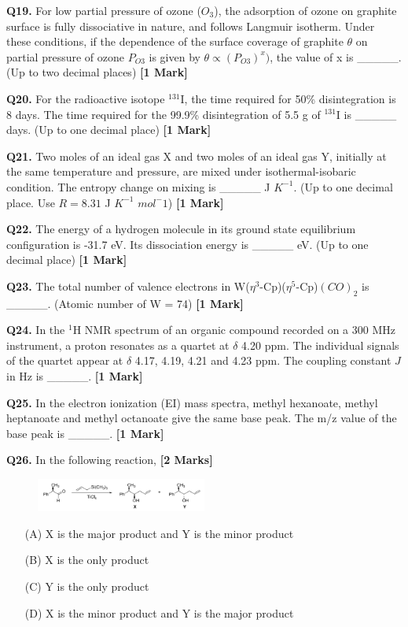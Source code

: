 \documentclass[11pt]{article}
\newcommand{\questiona}[2]{
    \noindent\textbf{Q#2.} #1 \hfill \textbf{[1 Mark]}
}
\newcommand{\questionb}[2]{
    \noindent\textbf{Q#2.} #1 \hfill \textbf{[2 Marks]}
}
\begin{document}
\questiona{For low partial pressure of ozone ($O_3$), the adsorption of ozone on graphite surface is fully dissociative in nature, and follows Langmuir isotherm. Under these conditions, if the dependence of the surface coverage of graphite \(\theta\) on partial pressure of ozone $P_{O3}$ is given by $\theta \propto (P_{O3})^x)$, the value of x is \_\_\_\_\_. (Up to two decimal places)}{19}
\vspace{0.5cm}

\questiona{For the radioactive isotope \(^{131}\)I, the time required for 50\% disintegration is 8 days. The time required for the 99.9\% disintegration of 5.5 g of \(^{131}\)I is \_\_\_\_\_ days. (Up to one decimal place)}{20}
\vspace{0.5cm}

\questiona{Two moles of an ideal gas X and two moles of an ideal gas Y, initially at the same temperature and pressure, are mixed under isothermal-isobaric condition. The entropy change on mixing is \_\_\_\_\_ J $K^{-1}$. (Up to one decimal place. Use \(R = 8.31\) J $K^{-1}$ $mol^-1$)}{21}
\vspace{0.5cm}

\questiona{The energy of a hydrogen molecule in its ground state equilibrium configuration is -31.7 eV. Its dissociation energy is \_\_\_\_\_ eV. (Up to one decimal place)}{22}
\vspace{0.5cm}

\questiona{The total number of valence electrons in W(\(\eta^3\)-Cp)(\(\eta^5\)-Cp)$(CO)_2$ is \_\_\_\_\_. (Atomic number of W = 74)}{23}
\vspace{0.5cm}

\questiona{In the \(^1\)H NMR spectrum of an organic compound recorded on a 300 MHz instrument, a proton resonates as a quartet at \(\delta\) 4.20 ppm. The individual signals of the quartet appear at \(\delta\) 4.17, 4.19, 4.21 and 4.23 ppm. The coupling constant \(J\) in Hz is \_\_\_\_\_.}{24}
\vspace{0.5cm}

\questiona{In the electron ionization (EI) mass spectra, methyl hexanoate, methyl heptanoate and methyl octanoate give the same base peak. The m/z value of the base peak is \_\_\_\_\_.}{25}
\vspace{0.5cm}

\questionb{In the following reaction,}{26}
\begin{figure}[h]
\centering
\includegraphics[width=0.5\textwidth]{figures/26}
\end{figure}
\begin{enumerate}
    \item[(A)] X is the major product and Y is the minor product
    \item[(B)] X is the only product
    \item[(C)] Y is the only product
    \item[(D)] X is the minor product and Y is the major product
\end{enumerate}
\vspace{0.5cm}
\end{document}
